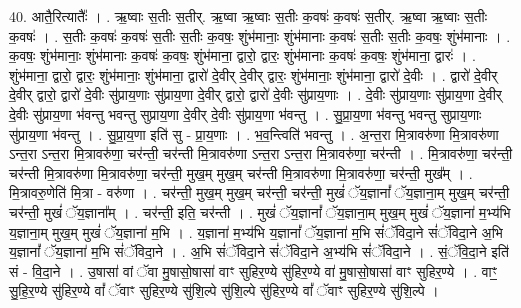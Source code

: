 \documentclass[17pt]{extarticle}
\begin{document}
40. आतै॒रित्यातैः᳚ । . ऋ॒ष्वाः स॒तीः स॒तीर्. ऋ॒ष्वा ऋ॒ष्वाः स॒तीः क॒वषः॑ क॒वषः॑ स॒तीर्. ऋ॒ष्वा ऋ॒ष्वाः स॒तीः क॒वषः॑ । . स॒तीः क॒वषः॑ क॒वषः॑ स॒तीः स॒तीः क॒वषः॒ शुंभ॑मानाः॒ शुंभ॑मानाः क॒वषः॑ स॒तीः स॒तीः क॒वषः॒ शुंभ॑मानाः । . क॒वषः॒ शुंभ॑मानाः॒ शुंभ॑मानाः क॒वषः॑ क॒वषः॒ शुंभ॑माना॒ द्वारो॒ द्वारः॒ शुंभ॑मानाः क॒वषः॑ क॒वषः॒ शुंभ॑माना॒ द्वारः॑ । . शुंभ॑माना॒ द्वारो॒ द्वारः॒ शुंभ॑मानाः॒ शुंभ॑माना॒ द्वारो॑ दे॒वीर् दे॒वीर् द्वारः॒ शुंभ॑मानाः॒ शुंभ॑माना॒ द्वारो॑ दे॒वीः । . द्वारो॑ दे॒वीर् दे॒वीर् द्वारो॒ द्वारो॑ दे॒वीः सु॑प्राय॒णाः सु॑प्राय॒णा दे॒वीर् द्वारो॒ द्वारो॑ दे॒वीः सु॑प्राय॒णाः । . दे॒वीः सु॑प्राय॒णाः सु॑प्राय॒णा दे॒वीर् दे॒वीः सु॑प्राय॒णा भ॑वन्तु भवन्तु सुप्राय॒णा दे॒वीर् दे॒वीः सु॑प्राय॒णा भ॑वन्तु । . सु॒प्रा॒य॒णा भ॑वन्तु भवन्तु सुप्राय॒णाः सु॑प्राय॒णा भ॑वन्तु । . सु॒प्रा॒य॒णा इति॑ सु - प्रा॒य॒णाः । . भ॒व॒न्त्विति॑ भवन्तु । . अ॒न्त॒रा मि॒त्रावरु॑णा मि॒त्रावरु॑णा ऽन्त॒रा ऽन्त॒रा मि॒त्रावरु॑णा॒ चर॑न्ती॒ चर॑न्ती मि॒त्रावरु॑णा ऽन्त॒रा ऽन्त॒रा मि॒त्रावरु॑णा॒ चर॑न्ती । . मि॒त्रावरु॑णा॒ चर॑न्ती॒ चर॑न्ती मि॒त्रावरु॑णा मि॒त्रावरु॑णा॒ चर॑न्ती॒ मुख॒म् मुख॒म् चर॑न्ती मि॒त्रावरु॑णा मि॒त्रावरु॑णा॒ चर॑न्ती॒ मुख᳚म् । . मि॒त्रावरु॒णेति॑ मि॒त्रा - वरु॑णा । . चर॑न्ती॒ मुख॒म् मुख॒म् चर॑न्ती॒ चर॑न्ती॒ मुखं॑ ॅय॒ज्ञानां᳚ ॅय॒ज्ञाना॒म् मुख॒म् चर॑न्ती॒ चर॑न्ती॒ मुखं॑ ॅय॒ज्ञाना᳚म् । . चर॑न्ती॒ इति॒ चर॑न्ती । . मुखं॑ ॅय॒ज्ञानां᳚ ॅय॒ज्ञाना॒म् मुख॒म् मुखं॑ ॅय॒ज्ञाना॑ म॒भ्य॑भि य॒ज्ञाना॒म् मुख॒म् मुखं॑ ॅय॒ज्ञाना॑ म॒भि । . य॒ज्ञाना॑ म॒भ्य॑भि य॒ज्ञानां᳚ ॅय॒ज्ञाना॑ म॒भि सं॑ॅविदा॒ने सं॑ॅविदा॒ने अ॒भि य॒ज्ञानां᳚ ॅय॒ज्ञाना॑ म॒भि सं॑ॅविदा॒ने । . अ॒भि सं॑ॅविदा॒ने सं॑ॅविदा॒ने अ॒भ्य॑भि सं॑ॅविदा॒ने । . सं॒ॅवि॒दा॒ने इति॑ सं - वि॒दा॒ने । . उ॒षासा॑ वां ॅवा मु॒षासो॒षासा॑ वाꣳ सुहिर॒ण्ये सु॑हिर॒ण्ये वा॑ मु॒षासो॒षासा॑ वाꣳ सुहिर॒ण्ये । . वाꣳ॒॒ सु॒हि॒र॒ण्ये सु॑हिर॒ण्ये वां᳚ ॅवाꣳ सुहिर॒ण्ये सु॑शि॒ल्पे सु॑शि॒ल्पे सु॑हिर॒ण्ये वां᳚ ॅवाꣳ सुहिर॒ण्ये सु॑शि॒ल्पे । \newline
\pagebreak
{}
\end{document}
